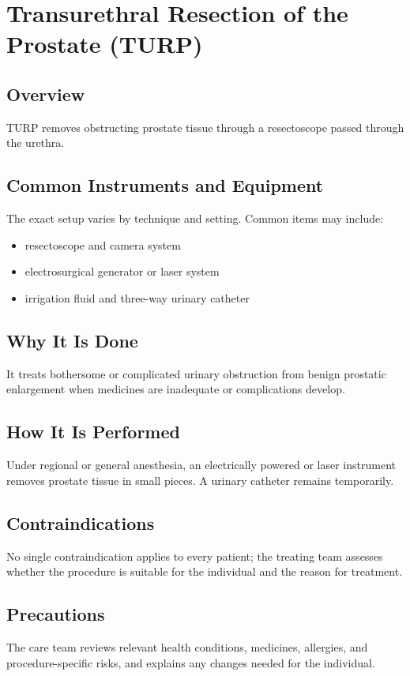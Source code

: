 \chapter{Transurethral Resection of the Prostate (TURP)}
\section*{Overview}
TURP removes obstructing prostate tissue through a resectoscope passed through the urethra.
\section*{Common Instruments and Equipment}
The exact setup varies by technique and setting. Common items may include:
\begin{itemize}[nosep,leftmargin=*]
  \item resectoscope and camera system
  \item electrosurgical generator or laser system
  \item irrigation fluid and three-way urinary catheter
\end{itemize}

\section*{Why It Is Done}
It treats bothersome or complicated urinary obstruction from benign prostatic enlargement when medicines are inadequate or complications develop.
\section*{How It Is Performed}
Under regional or general anesthesia, an electrically powered or laser instrument removes prostate tissue in small pieces. A urinary catheter remains temporarily.
\section*{Contraindications}
No single contraindication applies to every patient; the treating team assesses whether the procedure is suitable for the individual and the reason for treatment.

\section*{Precautions}
The care team reviews relevant health conditions, medicines, allergies, and procedure-specific risks, and explains any changes needed for the individual.

